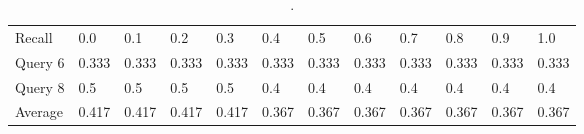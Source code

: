\begin{table}[H]
\centering
\begin{tabular}{ l l l l l l l l l l l l }
Recall & 0.0 & 0.1 & 0.2 & 0.3 & 0.4 & 0.5 & 0.6 & 0.7 & 0.8 & 0.9 & 1.0 \\
\cline{2-12}
Query 6 & 0.333 & 0.333 & 0.333 & 0.333 & 0.333 & 0.333 & 0.333 & 0.333 & 0.333 & 0.333 & 0.333 \\
\cline{2-12}
Query 8 & 0.5 & 0.5 & 0.5 & 0.5 & 0.4 & 0.4 & 0.4 & 0.4 & 0.4 & 0.4 & 0.4 \\
\cline{2-12}
Average & 0.417 & 0.417 & 0.417 & 0.417 & 0.367 & 0.367 & 0.367 & 0.367 & 0.367 & 0.367 & 0.367 \\
\cline{2-12}
\end{tabular}
\caption{.}
\label{tab:ipr68}
\end{table}
